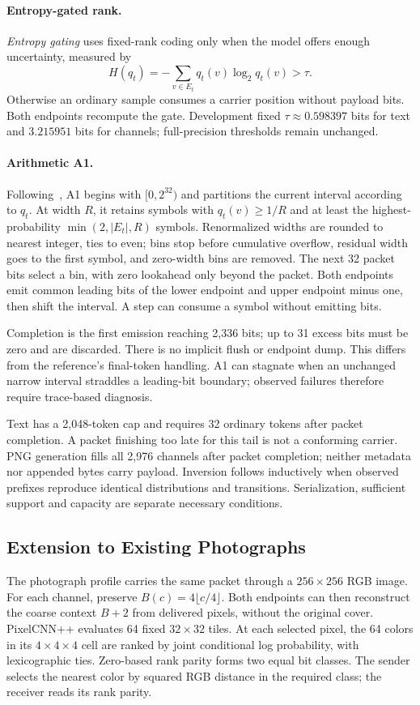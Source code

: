 \documentclass[orivec]{llncs}
\begin{document}
\paragraph{Entropy-gated rank.}
\emph{Entropy gating} uses fixed-rank coding only when the model offers enough uncertainty, measured by
\begin{equation}
H(q_t)=-\sum_{v\in E_t}q_t(v)\log_2q_t(v)>\tau.
\end{equation}
Otherwise an ordinary sample consumes a carrier position without payload bits. Both endpoints recompute the gate. Development fixed $\tau\approx0.598397$ bits for text and $3.215951$ bits for channels; full-precision thresholds remain unchanged.

\paragraph{Arithmetic A1.}
Following~\cite{ziegler}, A1 begins with $[0,2^{32})$ and partitions the current interval according to $q_t$. At width $R$, it retains symbols with $q_t(v)\geq1/R$ and at least the highest-probability $\min(2,|E_t|,R)$ symbols. Renormalized widths are rounded to nearest integer, ties to even; bins stop before cumulative overflow, residual width goes to the first symbol, and zero-width bins are removed. The next 32 packet bits select a bin, with zero lookahead only beyond the packet. Both endpoints emit common leading bits of the lower endpoint and upper endpoint minus one, then shift the interval. A step can consume a symbol without emitting bits.

Completion is the first emission reaching 2,336 bits; up to 31 excess bits must be zero and are discarded. There is no implicit flush or endpoint dump. This differs from the reference's final-token handling. A1 can stagnate when an unchanged narrow interval straddles a leading-bit boundary; observed failures therefore require trace-based diagnosis.

Text has a 2,048-token cap and requires 32 ordinary tokens after packet completion. A packet finishing too late for this tail is not a conforming carrier. PNG generation fills all 2,976 channels after packet completion; neither metadata nor appended bytes carry payload. Inversion follows inductively when observed prefixes reproduce identical distributions and transitions. Serialization, sufficient support and capacity are separate necessary conditions.

\subsection{Extension to Existing Photographs}
The photograph profile carries the same packet through a $256\times256$ RGB image. For each channel, preserve $B(c)=4\lfloor c/4\rfloor$. Both endpoints can then reconstruct the coarse context $B+2$ from delivered pixels, without the original cover. PixelCNN++ evaluates 64 fixed $32\times32$ tiles. At each selected pixel, the 64 colors in its $4\times4\times4$ cell are ranked by joint conditional log probability, with lexicographic ties. Zero-based rank parity forms two equal bit classes. The sender selects the nearest color by squared RGB distance in the required class; the receiver reads its rank parity.
\end{document}

